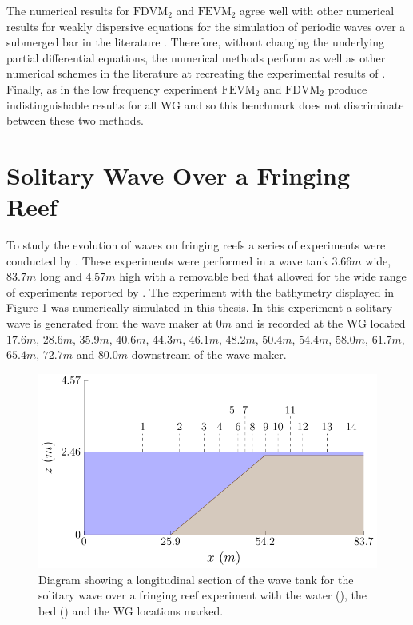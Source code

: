 The numerical results for $\text{FDVM}_2$ and $\text{FEVM}_2$ agree well with other numerical results for weakly dispersive equations for the simulation of periodic waves over a submerged bar in the literature \cite{Beji-Battjes-1994-1,Lannes-2013,Li-2014-169,Zhang-2013-13}. Therefore, without changing the underlying partial differential equations, the numerical methods perform as well as other numerical schemes in the literature at recreating the experimental results of \citet{Beji-Battjes-1994-1}. Finally, as in the low frequency experiment $\text{FEVM}_2$ and $\text{FDVM}_2$ produce indistinguishable results for all WG and so this benchmark does not discriminate between these two methods. 

\section{Solitary Wave Over a Fringing Reef}
To study the evolution of waves on fringing reefs a series of experiments were conducted by \citet{Roeber-2010}. These experiments were performed in a wave tank $3.66m$ wide, $83.7m$ long and $4.57m$ high with a removable bed that allowed for the wide range of experiments reported by \citet{Roeber-2010}. The experiment with the bathymetry displayed in Figure \ref{fig:RoeberWT} was numerically simulated in this thesis. In this experiment a solitary wave is generated from the wave maker at $0m$ and is recorded at the WG located $17.6m$, $28.6m$, $35.9m$, $40.6m$, $44.3m$, $46.1m$, $48.2m$, $50.4m$, $54.4m$, $58.0m$, $61.7m$, $65.4m$, $72.7m$ and $80.0m$ downstream of the wave maker.
\begin{figure}
	\centering
	\includegraphics[width=\textwidth]{./chp6/figures/Experiment/Roeber/Trial8/WaveTank.pdf}
	\caption{Diagram showing a longitudinal section of the wave tank for the solitary wave over a fringing reef experiment with the water (), the bed () and the WG locations marked.}
	\label{fig:RoeberWT}
\end{figure}

